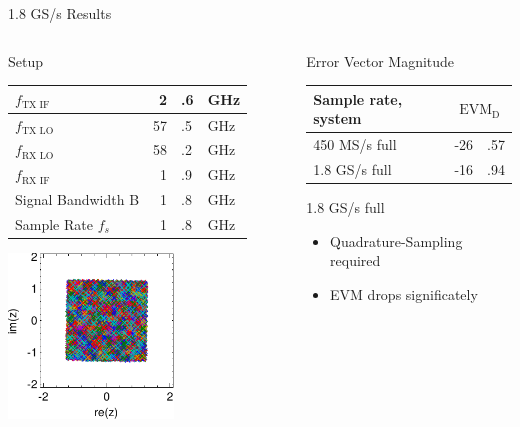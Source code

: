 \documentclass[10pt]{beamer}
\newcommand{\mc}[2]{\multicolumn{#1}{c|}{#2}}
\begin{document}
\begin{frame}{1.8 GS/s Results}
  \begin{columns}[T]
    \begin{column}{.5\textwidth}
      \begin{block}{Setup}
        \begin{tabular}{|l|r@{}l@{~}l|}
          \hline
          $f_{\text{TX IF}}$ & 2&.6&GHz \\ \hline
          $f_{\text{TX LO}}$ & 57&.5&GHz \\ \hline
          $f_{\text{RX LO}}$ & 58&.2&GHz \\ \hline
          $f_{\text{RX IF}}$ & 1&.9&GHz \\ \hline
          Signal Bandwidth B & 1&.8&GHz \\ \hline
          Sample Rate $f_s$ & 1&.8&GHz \\ \hline
        \end{tabular}
      \end{block}
      \includegraphics[width=0.6\textwidth]{figures/matlab/res_450_qam256_cp_corr_pcorr_initial}
    \end{column}
    \begin{column}{.5\textwidth}
      \begin{block}{Error Vector Magnitude}
        \begin{tabular}{|l|r@{}l|}
          \hline
          Sample rate, system             & \mc{2}{$\text{EVM}_\text{D}$} \\ \hline
          450 MS/s full                   & -26&.57      \\ \hline
          1.8 GS/s full                   & -16&.94      \\ \hline
        \end{tabular}
      \end{block}
      \begin{block}{1.8 GS/s full}
        \begin{itemize}
        \item Quadrature-Sampling required
        \item EVM drops significately
        \end{itemize}
      \end{block}
    \end{column}
  \end{columns}
\end{frame}
\end{document}
